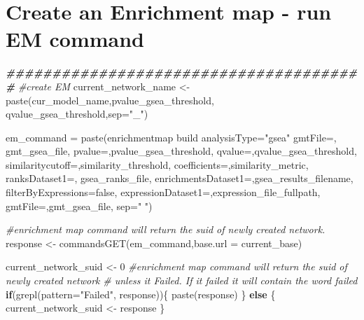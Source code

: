 \documentclass[
]{book}
\newenvironment{Shaded}{\begin{snugshade}}{\end{snugshade}}
\newcommand{\AttributeTok}[1]{\textcolor[rgb]{0.77,0.63,0.00}{#1}}
\newcommand{\CommentTok}[1]{\textcolor[rgb]{0.56,0.35,0.01}{\textit{#1}}}
\newcommand{\ControlFlowTok}[1]{\textcolor[rgb]{0.13,0.29,0.53}{\textbf{#1}}}
\newcommand{\DecValTok}[1]{\textcolor[rgb]{0.00,0.00,0.81}{#1}}
\newcommand{\DocumentationTok}[1]{\textcolor[rgb]{0.56,0.35,0.01}{\textbf{\textit{#1}}}}
\newcommand{\FunctionTok}[1]{\textcolor[rgb]{0.00,0.00,0.00}{#1}}
\newcommand{\NormalTok}[1]{#1}
\newcommand{\OtherTok}[1]{\textcolor[rgb]{0.56,0.35,0.01}{#1}}
\newcommand{\StringTok}[1]{\textcolor[rgb]{0.31,0.60,0.02}{#1}}
\begin{document}
\hypertarget{create-an-enrichment-map---run-em-command-1}{%
\section{Create an Enrichment map - run EM command}\label{create-an-enrichment-map---run-em-command-1}}

\begin{Shaded}
\begin{Highlighting}[]
\DocumentationTok{\#\#\#\#\#\#\#\#\#\#\#\#\#\#\#\#\#\#\#\#\#\#\#\#\#\#\#\#\#\#\#\#\#\#\#\#\#\#\#}
\CommentTok{\#create EM}
\NormalTok{current\_network\_name }\OtherTok{\textless{}{-}} \FunctionTok{paste}\NormalTok{(cur\_model\_name,pvalue\_gsea\_threshold,}
\NormalTok{                              qvalue\_gsea\_threshold,}\AttributeTok{sep=}\StringTok{"\_"}\NormalTok{)}

\NormalTok{em\_command }\OtherTok{=} \FunctionTok{paste}\NormalTok{(}\StringTok{\textquotesingle{}enrichmentmap build analysisType="gsea" gmtFile=\textquotesingle{}}\NormalTok{,}
\NormalTok{                                                              gmt\_gsea\_file,}
                   \StringTok{\textquotesingle{}pvalue=\textquotesingle{}}\NormalTok{,pvalue\_gsea\_threshold, }
                   \StringTok{\textquotesingle{}qvalue=\textquotesingle{}}\NormalTok{,qvalue\_gsea\_threshold,}
                   \StringTok{\textquotesingle{}similaritycutoff=\textquotesingle{}}\NormalTok{,similarity\_threshold,}
                   \StringTok{\textquotesingle{}coefficients=\textquotesingle{}}\NormalTok{,similarity\_metric,}
                   \StringTok{\textquotesingle{}ranksDataset1=\textquotesingle{}}\NormalTok{, gsea\_ranks\_file,}
                   \StringTok{\textquotesingle{}enrichmentsDataset1=\textquotesingle{}}\NormalTok{,gsea\_results\_filename, }
                   \StringTok{\textquotesingle{}filterByExpressions=false\textquotesingle{}}\NormalTok{,}
                   \StringTok{\textquotesingle{}expressionDataset1=\textquotesingle{}}\NormalTok{,expression\_file\_fullpath,}
                   \StringTok{\textquotesingle{}gmtFile=\textquotesingle{}}\NormalTok{,gmt\_gsea\_file,}
                   \AttributeTok{sep=}\StringTok{" "}\NormalTok{)}

\CommentTok{\#enrichment map command will return the suid of newly created network.}
\NormalTok{response }\OtherTok{\textless{}{-}} \FunctionTok{commandsGET}\NormalTok{(em\_command,}\AttributeTok{base.url =}\NormalTok{ current\_base)}

\NormalTok{current\_network\_suid }\OtherTok{\textless{}{-}} \DecValTok{0}
\CommentTok{\#enrichment map command will return the suid of newly created network }
\CommentTok{\# unless it Failed.  If it failed it will contain the word failed}
\ControlFlowTok{if}\NormalTok{(}\FunctionTok{grepl}\NormalTok{(}\AttributeTok{pattern=}\StringTok{"Failed"}\NormalTok{, response))\{}
  \FunctionTok{paste}\NormalTok{(response)}
\NormalTok{\} }\ControlFlowTok{else}\NormalTok{ \{}
\NormalTok{  current\_network\_suid }\OtherTok{\textless{}{-}}\NormalTok{ response}
\NormalTok{\}}


\end{Highlighting}
\end{Shaded}
\end{document}
